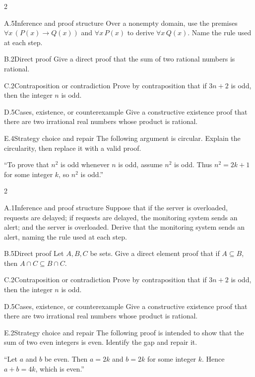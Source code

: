\documentclass[9pt]{extarticle}
\begin{document}
\begin{multicols}{2}
\begin{CoreProblem}{A.5}{Inference and proof structure}
Over a nonempty domain, use the premises
$\forall x\,(P(x)\to Q(x))$ and $\forall x\,P(x)$ to derive
$\forall x\,Q(x)$. Name the rule used at each step.
\end{CoreProblem}
\begin{CoreProblem}{B.2}{Direct proof}
Give a direct proof that the sum of two rational numbers is rational.
\end{CoreProblem}
\begin{CoreProblem}{C.2}{Contraposition or contradiction}
Prove by contraposition that if $3n+2$ is odd, then the integer $n$ is odd.
\end{CoreProblem}
\columnbreak
\begin{CoreProblem}{D.5}{Cases, existence, or counterexample}
Give a constructive existence proof that there are two irrational real numbers
whose product is rational.
\end{CoreProblem}
\begin{CoreProblem}{E.4}{Strategy choice and repair}
The following argument is circular. Explain the circularity, then replace it with a valid proof.

``To prove that $n^2$ is odd whenever $n$ is odd, assume $n^2$ is odd. Thus
$n^2=2k+1$ for some integer $k$, so $n^2$ is odd.''
\end{CoreProblem}
\end{multicols}
\CoreWorkArea
\FormBreak
{}
\begin{multicols}{2}
\begin{CoreProblem}{A.1}{Inference and proof structure}
Suppose that if the server is overloaded, requests are delayed; if requests are
delayed, the monitoring system sends an alert; and the server is overloaded.
Derive that the monitoring system sends an alert, naming the rule used at each
step.
\end{CoreProblem}
\begin{CoreProblem}{B.5}{Direct proof}
Let $A,B,C$ be sets. Give a direct element proof that if $A\subseteq B$, then
$A\cap C\subseteq B\cap C$.
\end{CoreProblem}
\begin{CoreProblem}{C.2}{Contraposition or contradiction}
Prove by contraposition that if $3n+2$ is odd, then the integer $n$ is odd.
\end{CoreProblem}
\columnbreak
\begin{CoreProblem}{D.5}{Cases, existence, or counterexample}
Give a constructive existence proof that there are two irrational real numbers
whose product is rational.
\end{CoreProblem}
\begin{CoreProblem}{E.2}{Strategy choice and repair}
The following proof is intended to show that the sum of two even integers is even. Identify the gap and repair it.

``Let $a$ and $b$ be even. Then $a=2k$ and $b=2k$ for some integer $k$. Hence $a+b=4k$, which is even.''
\end{CoreProblem}
\end{multicols}
\end{document}
